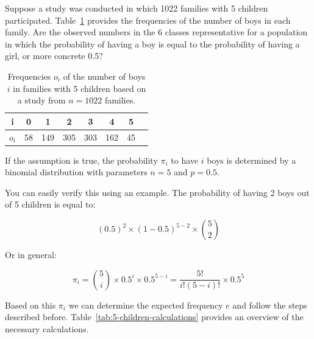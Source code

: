 Suppose a study was conducted in which 1022 families with 5 children participated. Table~\ref{tab:5-children} provides the frequencies of the number of boys in each family. Are the observed numbers in the 6 classes representative for a population in which the probability of having a boy is equal to the probability of having a girl, or more concrete 0.5?

\begin{table}
  \centering
  \begin{tabular}{@{}cccccccc@{}}
    \toprule
    i       & 0  & 1   & 2   & 3   & 4   & 5  &  \\
    \midrule
    $o_{i}$ & 58 & 149 & 305 & 303 & 162 & 45 &  \\
    \bottomrule
  \end{tabular}
  \caption{Frequencies $o_i$ of the number of boys $i$ in families with 5 children based on a study from $n = 1022$ families.}
  \label{tab:5-children}
\end{table}

If the assumption is true, the probability $\pi_{i}$ to have $i$ boys is determined by a binomial distribution with parameters $n=5$ and $p=0.5$.

You can easily verify this using an example. The probability of having 2 boys out of 5 children is equal to:

\[ (0.5)^{2} \times (1-0.5)^{5-2} \times \binom{5}{2} \]

Or in general:

\[ \pi_{i} = \binom{5}{i}\times 0.5^{i} \times 0.5^{5-i} = \frac{5!}{i!(5-i)!}\times 0.5^{5} \]

Based on this $\pi_{i}$ we can determine the expected frequency $e$ and follow the steps described before. Table~\ref{tab:5-children-calculations} provides an overview of the necessary calculations.

